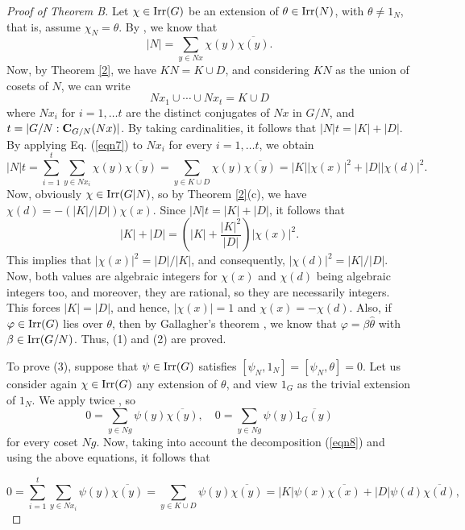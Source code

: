 \documentclass[12pt,leqno,a4paper]{amsart}
\numberwithin{equation}{section}
\begin{document}
\begin{proof}[Proof of Theorem B]
 Let $\chi\in{\rm Irr}(G)$ be an extension of $\theta\in {\rm Irr}(N)$, with $\theta\neq 1_N$, that is, assume $\chi_N=\theta$. By   \cite[Lemma 8.14(c)]{Isaacs}, we know that
\begin{equation}
|N|=\sum_{y\in Nx} \chi(y)\overline{\chi(y)}. \label{eqn7}
\end{equation}
Now, by Theorem \ref{2}, we have $KN=K\cup D$, and considering  $KN$ as the union of cosets of $N$, we can write 
\begin{equation} \label{eqn8}
Nx_1\cup \cdots \cup Nx_t= K\cup D
\end{equation}
where $Nx_i$ for $i=1,\ldots t$ are the distinct conjugates of $Nx$  in $G/N$, and $t=|G/N:{\bf C}_{G/N}(Nx)|$.
By taking cardinalities, it follows that $|N|t=|K|+|D|$.  By applying Eq. (\ref{eqn7}) to $Nx_i$ for every  $i=1,\ldots t$, we obtain
$$|N|t=\sum_{i=1}^t \sum_{y\in Nx_i} \chi(y)\overline{\chi(y)}= \sum_{y\in K \cup D} \chi(y)\overline{\chi(y)}=|K||\chi(x)|^2 + |D||\chi(d)|^2.$$
Now, obviously  $\chi\in {\rm Irr}(G|N)$, so by  Theorem \ref{2}(c), we have $\chi(d)=-(|K|/|D|)\chi(x)$. Since  $|N|t=|K|+|D|$, it follows that
$$|K|+|D|= (|K|+ \frac{|K|^2}{|D|})|\chi(x)|^2.$$
This implies that $|\chi(x)|^2= |D|/|K|$, and  consequently, $|\chi(d)|^2=|K|/|D|$. Now,  both values are algebraic integers for $\chi(x)$ and $\chi(d)$ being algebraic integers too,  and moreover, they are rational, so they are necessarily integers. This forces $|K|=|D|$, and hence,  $|\chi(x)|=1$ and $\chi(x)=-\chi(d)$.  Also, if  $\varphi\in {\rm Irr}(G)$ lies over $\theta$, then by  Gallagher's theorem \cite[Corollary 6.17]{Isaacs}, we know that $\varphi=\beta \hat{\theta}$ with $\beta \in {\rm Irr}(G/N)$. Thus, (1) and (2) are proved.

\medskip
To prove (3), suppose that $\psi\in{\rm Irr}(G)$  satisfies $[\psi_N, 1_N]= [\psi_N, \theta]=0$. Let us consider again $\chi\in{\rm Irr}(G)$  any extension of $\theta$, and view $1_G$ as the trivial extension of $1_N$. We apply  twice \cite[Lemma 8.14(b)]{Isaacs}, so
$$0=\sum_{y\in Ng} \psi (y)\overline{\chi(y)}, \quad   0=\sum_{y\in Ng} \psi (y)\overline{1_G(y)}$$
for every coset $Ng$. Now,  taking into account the decomposition (\ref{eqn8}) and using the above equations, it follows that

$$0=\sum_{i=1}^t \sum_{y\in Nx_i} \psi(y)\overline{\chi(y)}= \sum_{y\in K \cup D} \psi(y)\overline{\chi(y)}=|K|\psi(x)\overline{\chi(x)} + |D|\psi(d)\overline{\chi(d)},$$


\end{proof}
\end{document}
